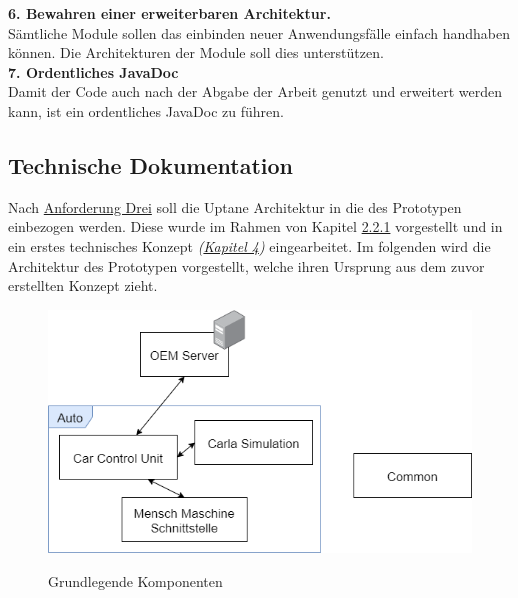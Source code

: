 \textbf{6. Bewahren einer erweiterbaren Architektur.}\label{tecreq6}\\
Sämtliche Module sollen das einbinden neuer Anwendungsfälle einfach handhaben können. Die Architekturen der Module soll dies unterstützen.\\

\textbf{7. Ordentliches JavaDoc}\label{tecreq7}\\
Damit der Code auch nach der Abgabe der Arbeit genutzt und erweitert werden kann, ist ein ordentliches JavaDoc zu führen.\\

\subsection{Technische Dokumentation}\label{architecture}
Nach \hyperref[tecreq3]{Anforderung Drei} soll die Uptane Architektur in die des Prototypen einbezogen werden. Diese wurde im Rahmen von Kapitel \hyperref[uptane]{2.2.1} vorgestellt und in ein erstes technisches Konzept \textit{(\hyperref[technGrundkonzept]{Kapitel 4})} eingearbeitet. Im folgenden wird die Architektur des Prototypen vorgestellt, welche ihren Ursprung aus dem zuvor erstellten Konzept zieht.\\
\begin{figure}[!h]
	\centering
	\includegraphics[width=0.8\columnwidth]{pictures/basic.png}
	\label{img:basic}
	\caption{Grundlegende Komponenten}
\end{figure}\\

